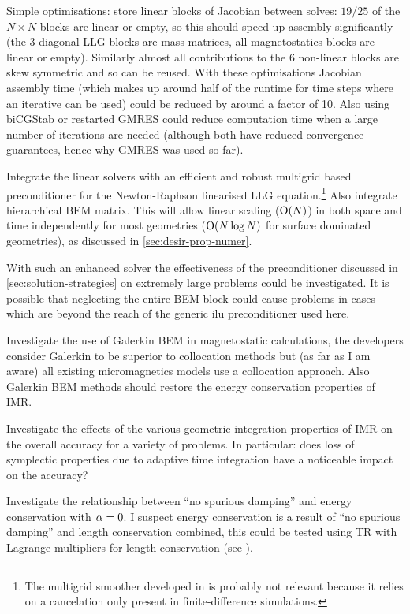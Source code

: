 Simple optimisations: store linear blocks of Jacobian between solves: $19/25$ of the $N \times N$ blocks are linear or empty, so this should speed up assembly significantly (the 3 diagonal LLG blocks are mass matrices, all magnetostatics blocks are linear or empty).
Similarly almost all contributions to the 6 non-linear blocks are skew symmetric and so can be reused.
With these optimisations Jacobian assembly time (which makes up around half of the runtime for time steps where an iterative can be used) could be reduced by around a factor of 10.
Also using biCGStab or restarted GMRES could reduce computation time when a large number of iterations are needed (although both have reduced convergence guarantees, hence why GMRES was used so far).


Integrate the linear solvers with an efficient and robust multigrid based preconditioner for the Newton-Raphson linearised LLG equation.\footnote{The multigrid smoother developed in \cite{Jeong2014} is probably not relevant because it relies on a cancelation only present in finite-difference simulations.}
Also integrate hierarchical BEM matrix.
This will allow linear scaling (\ie $\mathrm{O}{\left( N \right)}$) in both space and time independently for most geometries ($\mathrm{O}{\left( N \log N \right)}$ for surface dominated geometries), as discussed in \cref{sec:desir-prop-numer}.


With such an enhanced solver the effectiveness of the preconditioner discussed in \cref{sec:solution-strategies} on extremely large problems could be investigated.
It is possible that neglecting the entire BEM block could cause problems in cases which are beyond the reach of the generic ilu preconditioner used here.


Investigate the use of Galerkin BEM in magnetostatic calculations, the \hlib developers consider Galerkin to be superior to collocation methods but (as far as I am aware) all existing micromagnetics models use a collocation approach.
Also Galerkin BEM methods should restore the energy conservation properties of IMR.


Investigate the effects of the various geometric integration properties of IMR on the overall accuracy for a variety of problems.
In particular: does loss of symplectic properties due to adaptive time integration have a noticeable impact on the accuracy?


Investigate the relationship between ``no spurious damping'' and energy conservation with $\alpha = 0$.
I suspect energy conservation is a result of ``no spurious damping'' and length conservation combined, this could be tested using TR with Lagrange multipliers for length conservation (see \eg \cite{Szambolics2008a}).



